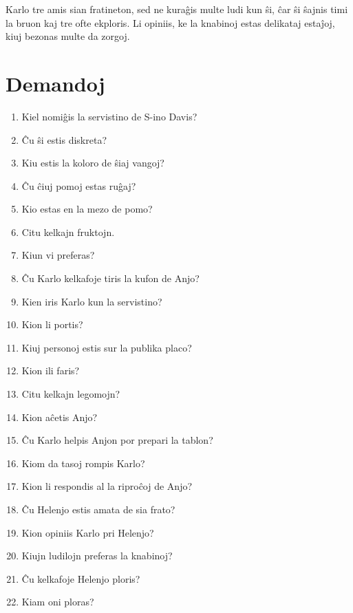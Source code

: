 Karlo tre amis sian fratineton, sed ne kuraĝis multe ludi kun ŝi, ĉar ŝi ŝajnis timi la bruon kaj tre ofte ekploris. Li opiniis, ke la knabinoj estas delikataj estaĵoj, kiuj bezonas multe da zorgoj.

\newpage

\section*{Demandoj}

\begin{enumerate}
    \item  Kiel nomiĝis la servistino de S-ino Davis?
    \item  Ĉu ŝi estis diskreta?
    \item  Kiu estis la koloro de ŝiaj vangoj?
    \item  Ĉu ĉiuj pomoj estas ruĝaj?
    \item  Kio estas en la mezo de pomo?
    \item  Citu kelkajn fruktojn.
    \item  Kiun vi preferas?
    \item  Ĉu Karlo kelkafoje tiris la kufon de Anjo?
    \item  Kien iris Karlo kun la servistino?
    \item  Kion li portis?
    \item  Kiuj personoj estis sur la publika placo?
    \item  Kion ili faris?
    \item  Citu kelkajn legomojn?
    \item  Kion aĉetis Anjo?
    \item  Ĉu Karlo helpis Anjon por prepari la tablon?
    \item  Kiom da tasoj rompis Karlo?
    \item  Kion li respondis al la riproĉoj de Anjo?
    \item  Ĉu Helenjo estis amata de sia frato?
    \item  Kion opiniis Karlo pri Helenjo?
    \item  Kiujn ludilojn preferas la knabinoj?
    \item  Ĉu kelkafoje Helenjo ploris?
    \item  Kiam oni ploras?
\end{enumerate}
